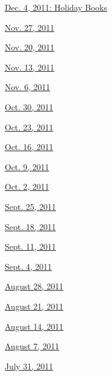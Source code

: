 \href{http://www.nytimes3xbfgragh.onion/indexes/2011/12/04/books/review/index.html}{Dec.
4, 2011: Holiday Books}

\href{http://www.nytimes3xbfgragh.onion/indexes/2011/11/27/books/review/index.html}{Nov.
27, 2011}

\href{http://www.nytimes3xbfgragh.onion/indexes/2011/11/20/books/review/index.html}{Nov.
20, 2011}

\href{http://www.nytimes3xbfgragh.onion/indexes/2011/11/13/books/review/index.html}{Nov.
13, 2011}

\href{http://www.nytimes3xbfgragh.onion/indexes/2011/11/05/books/review/index.html}{Nov.
6, 2011}

\href{http://www.nytimes3xbfgragh.onion/indexes/2011/10/28/books/review/index.html}{Oct.
30, 2011}

\href{http://www.nytimes3xbfgragh.onion/indexes/2011/10/21/books/review/index.html}{Oct.
23, 2011}

\href{http://www.nytimes3xbfgragh.onion/indexes/2011/10/14/books/review/index.html}{Oct.
16, 2011}

\href{http://www.nytimes3xbfgragh.onion/indexes/2011/10/07/books/review/index.html}{Oct.
9, 2011}

\href{http://www.nytimes3xbfgragh.onion/indexes/2011/09/30/books/review/index.html}{Oct.
2, 2011}

\href{http://www.nytimes3xbfgragh.onion/indexes/2011/09/23/books/review/index.html}{Sept.
25, 2011}

\href{http://www.nytimes3xbfgragh.onion/indexes/2011/09/16/books/review/index.html}{Sept.
18, 2011}

\href{http://www.nytimes3xbfgragh.onion/indexes/2011/09/09/books/review/index.html}{Sept.
11, 2011}

\href{http://www.nytimes3xbfgragh.onion/indexes/2011/09/02/books/review/index.html}{Sept.
4, 2011}

\href{http://www.nytimes3xbfgragh.onion/indexes/2011/08/26/books/review/index.html}{August
28, 2011}

\href{http://www.nytimes3xbfgragh.onion/indexes/2011/08/19/books/review/index.html}{August
21, 2011}

\href{http://www.nytimes3xbfgragh.onion/indexes/2011/08/13/books/review/index.html}{August
14, 2011}

\href{http://www.nytimes3xbfgragh.onion/indexes/2011/08/07/books/review/index.html}{August
7, 2011}

\href{http://www.nytimes3xbfgragh.onion/indexes/2011/07/30/books/review/index.html}{July
31, 2011}


